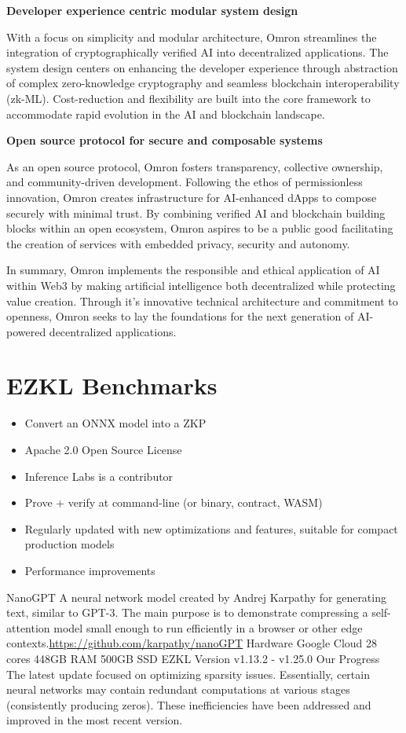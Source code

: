 \documentclass[conference]{IEEEtran}
\begin{document}
\noindent \textbf{Developer experience centric modular system design}

With a focus on simplicity and modular architecture, Omron streamlines the integration of cryptographically verified AI into decentralized applications. The system design centers on enhancing the developer experience through abstraction of complex zero-knowledge cryptography and seamless blockchain interoperability (zk-ML). Cost-reduction and flexibility are built into the core framework to accommodate rapid evolution in the AI and blockchain landscape.

\noindent \textbf{Open source protocol for secure and composable systems}

As an open source protocol, Omron fosters transparency, collective ownership, and community-driven development. Following the ethos of permissionless innovation, Omron creates infrastructure for AI-enhanced dApps to compose securely with minimal trust. By combining verified AI and blockchain building blocks within an open ecosystem, Omron aspires to be a public good facilitating the creation of services with embedded privacy, security and autonomy.

In summary, Omron implements the responsible and ethical application of AI within Web3 by making artificial intelligence both decentralized while protecting value creation. Through it’s innovative technical architecture and commitment to openness, Omron seeks to lay the foundations for the next generation of AI-powered decentralized applications.

\newpage

\section{EZKL Benchmarks}
\begin{itemize}
\item 	Convert an ONNX model into a ZKP
\item	Apache 2.0 Open Source License
\item	Inference Labs is a contributor
\item	Prove + verify at command-line (or binary, contract, WASM)
\item	Regularly updated with new optimizations and features, suitable for compact production models
\item	Performance improvements

\end{itemize}

NanoGPT A neural network model created by Andrej Karpathy for generating text, similar to GPT-3. The main purpose is to demonstrate compressing a self-attention model small enough to run efficiently in a browser or other edge contexts.\url{https://github.com/karpathy/nanoGPT} 
Hardware Google Cloud 28 cores 448GB RAM 500GB SSD 
EZKL Version v1.13.2 - v1.25.0
Our Progress The latest update focused on optimizing sparsity issues. Essentially, certain neural networks may contain redundant computations at various stages (consistently producing zeros). These inefficiencies have been addressed and improved in the most recent version.
\end{document}
